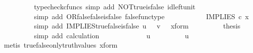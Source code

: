 \begin{isabellebody}
\ \ \ \ \ \ \ \ \isamarkupfalse%
\ {\isacharparenleft}{\kern0pt}typecheck{\isacharunderscore}{\kern0pt}cfuncs{\isacharcomma}{\kern0pt}\ simp\ add{\isacharcolon}{\kern0pt}\ NOT{\isacharunderscore}{\kern0pt}true{\isacharunderscore}{\kern0pt}is{\isacharunderscore}{\kern0pt}false\ id{\isacharunderscore}{\kern0pt}left{\isacharunderscore}{\kern0pt}unit{}{\isacharparenright}{\kern0pt}\isanewline
\ \ \ \ \ \ \isamarkupfalse%
\ \isamarkupfalse%
\ {\isachardoublequoteopen}{\isachardot}{\kern0pt}{\isachardot}{\kern0pt}{\isachardot}{\kern0pt}\ {\isacharequal}{\kern0pt}\ {\isasymf}{\isachardoublequoteclose}\isanewline
\ \ \ \ \ \ \ \ \isamarkupfalse%
\ {\isacharparenleft}{\kern0pt}simp\ add{\isacharcolon}{\kern0pt}\ OR{\isacharunderscore}{\kern0pt}false{\isacharunderscore}{\kern0pt}false{\isacharunderscore}{\kern0pt}is{\isacharunderscore}{\kern0pt}false\ false{\isacharunderscore}{\kern0pt}func{\isacharunderscore}{\kern0pt}type{\isacharparenright}{\kern0pt}\isanewline
\ \ \ \ \ \ \isamarkupfalse%
\ \isamarkupfalse%
\ {\isachardoublequoteopen}{\isachardot}{\kern0pt}{\isachardot}{\kern0pt}{\isachardot}{\kern0pt}\ {\isacharequal}{\kern0pt}\ IMPLIES\ {\isasymcirc}\isactrlsub c\ x{\isachardoublequoteclose}\isanewline
\ \ \ \ \ \ \ \ \isamarkupfalse%
\ {\isacharparenleft}{\kern0pt}simp\ add{\isacharcolon}{\kern0pt}\ IMPLIES{\isacharunderscore}{\kern0pt}true{\isacharunderscore}{\kern0pt}false{\isacharunderscore}{\kern0pt}is{\isacharunderscore}{\kern0pt}false\ {\isacartoucheopen}u\ {\isacharequal}{\kern0pt}\ {\isasymt}{\isacartoucheclose}\ {\isacartoucheopen}v\ {\isacharequal}{\kern0pt}\ {\isasymf}{\isacartoucheclose}\ x{\isacharunderscore}{\kern0pt}form{\isacharparenright}{\kern0pt}\isanewline
\ \ \ \ \ \ \isamarkupfalse%
\ \isamarkupfalse%
\ {\isacharquery}{\kern0pt}thesis\isanewline
\ \ \ \ \ \ \ \ \isamarkupfalse%
\ {\isacharparenleft}{\kern0pt}simp\ add{\isacharcolon}{\kern0pt}\ calculation{\isacharparenright}{\kern0pt}\isanewline
\ \ \ \ \isamarkupfalse%
\isanewline
\ \ \isamarkupfalse%
\isanewline
\ \ \ \ \isamarkupfalse%
\ {\isachardoublequoteopen}u\ {\isasymnoteq}\ {\isasymt}{\isachardoublequoteclose}\isanewline
\ \ \ \ \isamarkupfalse%
\ \isamarkupfalse%
\ {\isachardoublequoteopen}u\ {\isacharequal}{\kern0pt}\ {\isasymf}{\isachardoublequoteclose}\isanewline
\ \ \ \ \ \ \ \ \isamarkupfalse%
\ {\isacharparenleft}{\kern0pt}metis\ true{\isacharunderscore}{\kern0pt}false{\isacharunderscore}{\kern0pt}only{\isacharunderscore}{\kern0pt}truth{\isacharunderscore}{\kern0pt}values\ x{\isacharunderscore}{\kern0pt}form{\isacharparenright}{\kern0pt}\isanewline

\end{isabellebody}

